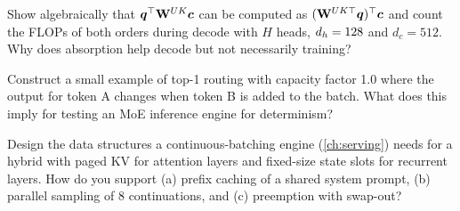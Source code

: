 \begin{exercise}
Show algebraically that $\bm{q}^\top\mathbf{W}^{UK}\bm{c}$ can be computed as $(\mathbf{W}^{UK\top}\bm{q})^\top\bm{c}$
and count the FLOPs of both orders during decode with $H$ heads, $d_{h}=128$ and $d_c=512$. Why does
absorption help decode but not necessarily training?
\end{exercise}

\begin{exercise}
Construct a small example of top-1 routing with capacity factor 1.0 where the output for token A changes when
token B is added to the batch. What does this imply for testing an MoE inference engine for determinism?
\end{exercise}

\begin{exercise}
Design the data structures a continuous-batching engine (\cref{ch:serving}) needs for a hybrid with paged KV
for attention layers and fixed-size state slots for recurrent layers. How do you support (a) prefix caching
of a shared system prompt, (b) parallel sampling of 8 continuations, and (c) preemption with swap-out?
\end{exercise}


